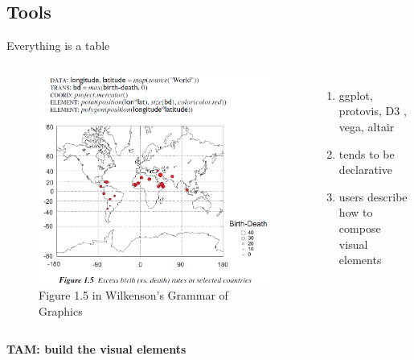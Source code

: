 \documentclass[xcolor={dvipsnames}, handout]{beamer}
\begin{document}
\subsection{Tools}
\begin{frame}{Everything is a table}
\begin{columns}
    \begin{figure}
        \includegraphics[width=1\textwidth]{figures/intro/grammar_example.png}
        \caption{Figure 1.5 in Wilkenson's Grammar of Graphics\cite{wilkinsonGrammarGraphics2005}}
    \end{figure}
        \begin{enumerate}
            \item  ggplot\cite{wickhamGgplot2ElegantGraphics2016a}, protovis\cite{bostockProtoviz2009}, D3 \cite{bostockDataDrivenDocuments2011}, vega\cite{satyanarayanDeclarativeInteractionDesign2014}, altair\cite{vanderplasAltairInteractiveStatistical2018}
            \item tends to be declarative\cite{heerDeclarative2010} 
            \item users describe how to compose visual elements \cite{wongsuphasawatNavigatingWideWorld2021}
        \end{enumerate}
    \end{columns}
    \pause
    \begin{center}
        \textbf{TAM: build the visual elements}
    \end{center}
\end{frame}
\end{document}
